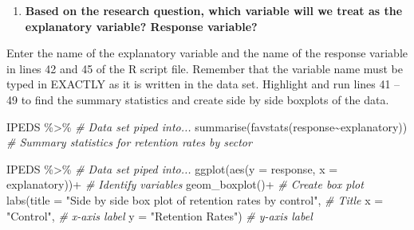 \documentclass[
]{report}
\newenvironment{Shaded}{\begin{snugshade}}{\end{snugshade}}
\newcommand{\AttributeTok}[1]{\textcolor[rgb]{0.77,0.63,0.00}{#1}}
\newcommand{\CommentTok}[1]{\textcolor[rgb]{0.56,0.35,0.01}{\textit{#1}}}
\newcommand{\FunctionTok}[1]{\textcolor[rgb]{0.00,0.00,0.00}{#1}}
\newcommand{\NormalTok}[1]{#1}
\newcommand{\SpecialCharTok}[1]{\textcolor[rgb]{0.00,0.00,0.00}{#1}}
\newcommand{\StringTok}[1]{\textcolor[rgb]{0.31,0.60,0.02}{#1}}
\providecommand{\tightlist}{%
  \setlength{\itemsep}{0pt}\setlength{\parskip}{0pt}}
\begin{document}
\begin{enumerate}
\def\labelenumi{\arabic{enumi}.}
\setcounter{enumi}{13}
\tightlist
\item
  \textbf{Based on the research question, which variable will we treat as the explanatory variable? Response variable?}
\end{enumerate}

\vspace{0.8in}

Enter the name of the explanatory variable and the name of the response variable in lines 42 and 45 of the R script file. Remember that the variable name must be typed in EXACTLY as it is written in the data set. Highlight and run lines 41 -- 49 to find the summary statistics and create side by side boxplots of the data.

\begin{Shaded}
\begin{Highlighting}[]
\NormalTok{IPEDS }\SpecialCharTok{\%\textgreater{}\%}  \CommentTok{\# Data set piped into...}
  \FunctionTok{summarise}\NormalTok{(}\FunctionTok{favstats}\NormalTok{(response}\SpecialCharTok{\textasciitilde{}}\NormalTok{explanatory)) }\CommentTok{\# Summary statistics for retention rates by sector}
\end{Highlighting}
\end{Shaded}

\begin{Shaded}
\begin{Highlighting}[]
\NormalTok{IPEDS }\SpecialCharTok{\%\textgreater{}\%}  \CommentTok{\# Data set piped into...}
  \FunctionTok{ggplot}\NormalTok{(}\FunctionTok{aes}\NormalTok{(}\AttributeTok{y =}\NormalTok{ response, }\AttributeTok{x =}\NormalTok{ explanatory))}\SpecialCharTok{+}  \CommentTok{\# Identify variables}
  \FunctionTok{geom\_boxplot}\NormalTok{()}\SpecialCharTok{+}  \CommentTok{\# Create box plot}
  \FunctionTok{labs}\NormalTok{(}\AttributeTok{title =} \StringTok{"Side by side box plot of retention rates by control"}\NormalTok{,  }\CommentTok{\# Title}
       \AttributeTok{x =} \StringTok{"Control"}\NormalTok{,    }\CommentTok{\# x{-}axis label}
       \AttributeTok{y =} \StringTok{"Retention Rates"}\NormalTok{)  }\CommentTok{\# y{-}axis label}
\end{Highlighting}
\end{Shaded}
\end{document}
